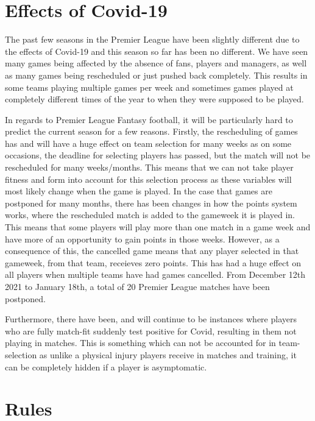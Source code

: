 \documentclass[12pt, a4paper, oneside]{book}
\numberwithin{equation}{section}
\begin{document}
\section{Effects of Covid-19}\label{sec:2.2}

The past few seasons in the Premier League have been slightly different due to the effects of Covid-19 and this season so far has been no different. We have seen many games being affected by the absence of fans, players and managers, as well as many games being rescheduled or just pushed back completely. This results in some teams playing multiple games per week and sometimes games played at completely different times of the year to when they were supposed to be played.

In regards to Premier League Fantasy football, it will be particularly hard to predict the current season for a few reasons. Firstly, the rescheduling of games has and will have a huge effect on team selection for many weeks as on some occasions, the deadline for selecting players has passed, but the match will not be rescheduled for many weeks/months.
This means that we can not take player fitness and form into account for this selection process as these variables will most likely change when the game is played. In the case that games are postponed for many months, there has been changes in how the points system works, where the rescheduled match is added to the gameweek it is played in. This means that some players will play more than one match in a game week and have more of an opportunity to gain points in those weeks. However, as a consequence of this, the cancelled game means that any player selected in that gameweek, from that team, receieves zero points. This has had a huge effect on all players when multiple teams have had games cancelled. From December 12th 2021 to January 18th, a total of 20 Premier League matches have been postponed.

Furthermore, there have been, and will continue to be instances where players who are fully match-fit suddenly test positive for Covid, resulting in them not playing in matches. This is something which can not be accounted for in team-selection as unlike a physical injury players receive in matches and training, it can be completely hidden if a player is asymptomatic.

\section{Rules}\label{sec:2.3}
\end{document}
